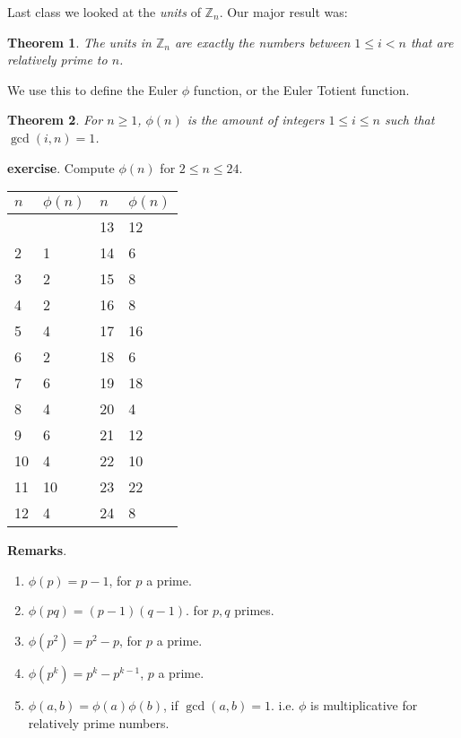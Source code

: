 \documentclass[11pt]{article}
\newtheorem{thm}{Theorem}
\theoremstyle{definition}
\numberwithin{thm}{section}
\begin{document}
Last class we looked at the \textit{units} of $\mathbb{Z}_n$. Our major result was:

\begin{thm} The units in $\mathbb{Z}_n$ are exactly the numbers between $1 \leq i < n$ that are relatively prime to $n$.
\end{thm}

We use this to define the Euler $\phi$ function, or the Euler Totient function.

\begin{thm} For $n \geq 1$, $\phi(n)$ is the amount of integers $1 \leq i \leq n$ such that $\gcd(i,n) = 1$.
\end{thm}

\textbf{exercise}. Compute $\phi(n)$ for $2 \leq n \leq 24$.

\begin{table}[!ht]
\begin{tabular}{l|l|l|l}
$n$ & $\phi(n)$ & $n$ & $\phi(n)$ \\ \hline
    &           & 13  & 12        \\
2   & 1         & 14  & 6         \\
3   & 2         & 15  & 8         \\
4   & 2         & 16  & 8         \\
5   & 4         & 17  & 16        \\
6   & 2         & 18  & 6         \\
7   & 6         & 19  & 18        \\
8   & 4         & 20  & 4         \\
9   & 6         & 21  & 12        \\
10  & 4         & 22  & 10        \\
11  & 10        & 23  & 22        \\
12  & 4         & 24  & 8        
\end{tabular}
\end{table}

\textbf{Remarks}. 
\begin{enumerate}
	\item $\phi(p) = p-1$, for $p$ a prime. 
    \item $\phi(pq) = (p-1)(q-1)$. for $p,q$ primes.
    \item $\phi(p^2) = p^2 - p$, for $p$ a prime.
    \item $\phi(p^k) = p^k - p^{k-1}$, $p$ a prime.
    \item $\phi(a,b) = \phi(a)\phi(b)$, if $\gcd(a,b) = 1$. i.e. $\phi$ is multiplicative for relatively prime numbers.
\end{enumerate}
\end{document}
